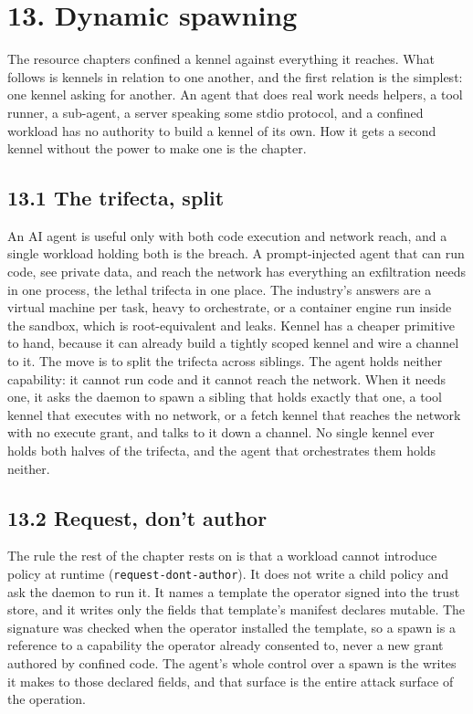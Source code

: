 \hypertarget{dynamic-spawning}{%
\chapter{13. Dynamic spawning}\label{dynamic-spawning}}

The resource chapters confined a kennel against everything it reaches.
What follows is kennels in relation to one another, and the first
relation is the simplest: one kennel asking for another. An agent that
does real work needs helpers, a tool runner, a sub-agent, a server
speaking some stdio protocol, and a confined workload has no authority
to build a kennel of its own. How it gets a second kennel without the
power to make one is the chapter.

\hypertarget{the-trifecta-split}{%
\section{13.1 The trifecta, split}\label{the-trifecta-split}}

An AI agent is useful only with both code execution and network reach,
and a single workload holding both is the breach. A prompt-injected
agent that can run code, see private data, and reach the network has
everything an exfiltration needs in one process, the lethal trifecta in
one place. The industry's answers are a virtual machine per task, heavy
to orchestrate, or a container engine run inside the sandbox, which is
root-equivalent and leaks. Kennel has a cheaper primitive to hand,
because it can already build a tightly scoped kennel and wire a channel
to it. The move is to split the trifecta across siblings. The agent
holds neither capability: it cannot run code and it cannot reach the
network. When it needs one, it asks the daemon to spawn a sibling that
holds exactly that one, a tool kennel that executes with no network, or
a fetch kennel that reaches the network with no execute grant, and talks
to it down a channel. No single kennel ever holds both halves of the
trifecta, and the agent that orchestrates them holds neither.

\hypertarget{request-dont-author}{%
\section{13.2 Request, don't author}\label{request-dont-author}}

The rule the rest of the chapter rests on is that a workload cannot
introduce policy at runtime (\texttt{request-dont-author}). It does not
write a child policy and ask the daemon to run it. It names a template
the operator signed into the trust store, and it writes only the fields
that template's manifest declares mutable. The signature was checked
when the operator installed the template, so a spawn is a reference to a
capability the operator already consented to, never a new grant authored
by confined code. The agent's whole control over a spawn is the writes
it makes to those declared fields, and that surface is the entire attack
surface of the operation.

